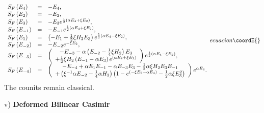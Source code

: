 \documentclass[a4paper,12pt,showkeys]{article}
\begin{document}
\begin{equation}
{\begin{array}{lcl}
S_{F}\left( {E}_{4}\right)  & = & -{E}_{4}, \\
S_{F}\left( {E}_{2}\right)  & = & -{E}_{2}, \\
S_{F}\left( E_{3}\right)  & = & - E_{3}e^{\frac{1}{2}\left( \alpha {E}
_{4}+ \xi {E}_{2}\right) }, \\
S_{F}\left( E_{-1}\right)  & = & -E_{-1}e^{\frac{1}{2}\left( \alpha {E
}_{4} +\xi {E}_{2}\right) }, \\
S_{F}\left( E_{1}\right)  & = & \left( -E_{1}+\frac{1}{2}\xi
H_{2}E_{3}\right) e^{\frac{1}{2}\left( \alpha {E}_{4} - \xi {E}
_{2}\right) }, \\
S_{F}\left( E_{-2}\right)  & = & -E_{-2}e^{-\xi {E}_{2}}, \\
S_{F}\left( E_{-3}\right)  & = & \left(
\begin{array}{c}
 -E_{-3}-\alpha \left( E_{-2}
-\frac{1}{4}\xi H_2 \right)E_{3} \\
+\frac{1}{2
}\xi H_{2}\left( E_{-1}-\alpha E_{3}\right) e^{\left( \alpha {E}
_{4}+\xi {E}_{2}\right) }
\end{array}
\right) e^{\frac{1}{2}\left( \alpha {E
}_{4} - \xi {E}_{2}\right) }, \\
S_{F}\left( E_{-4}\right)  & = & \left(
\begin{array}{c}
-E_{-4}+\alpha E_{1}E_{-1}- \alpha E_{-3}E_{3}
-\frac{1}{2}\alpha \xi H_{2}E_{3}E_{-1}
\\
+\left( \xi ^{-1}\alpha E_{-2}-\frac{1}{4}\alpha H_{2}\right) \left(
1-e^{\left(- \xi {E}_{2}-\alpha {E}_{4}\right) }-\frac{1}{2}
\alpha \xi E_{3}^{2}\right)
\end{array}
\right) e^{\alpha {E}_{4}}.
\end{array}
}{ecuacion}\coordE{}\end{equation}
The counits remain classical.

v) {\bf Deformed Bilinear Casimir}
\end{document}

